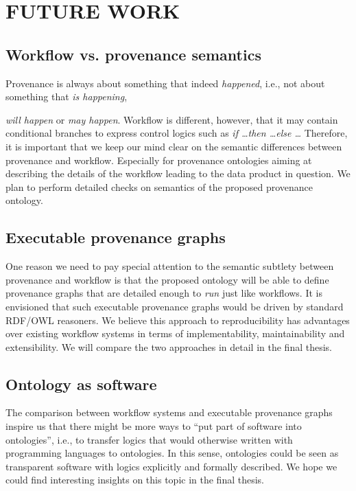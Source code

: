 \chapter{FUTURE WORK}
\label{future-work}
\section{Workflow vs. provenance semantics}
Provenance is always about something that indeed \emph{happened}, i.e., not about something that \emph{is happening}, {\emph{will happen} or \emph{may happen}. Workflow is different, however, that it may contain conditional branches to express control logics such as \emph{if \dots then \dots else \dots} Therefore, it is important that we keep our mind clear on the semantic differences between provenance and workflow. Especially for provenance ontologies aiming at describing the details of the workflow leading to the data product in question. We plan to perform detailed checks on semantics of the proposed provenance ontology.

\section{Executable provenance graphs}
One reason we need to pay special attention to the semantic subtlety between provenance and workflow is that the proposed ontology will be able to define provenance graphs that are detailed enough to \emph{run} just like workflows. It is envisioned that such executable provenance graphs would be driven by standard RDF/OWL reasoners. We believe this approach to reproducibility has advantages over existing workflow systems in terms of implementability, maintainability and extensibility. We will compare the two approaches in detail in the final thesis.

\section{Ontology as software}
The comparison between workflow systems and executable provenance graphs inspire us that there might be more ways to ``put part of software into ontologies'', i.e., to transfer logics that would otherwise written with programming languages to ontologies. In this sense, ontologies could be seen as transparent software with logics explicitly and formally described. We hope we could find interesting insights on this topic in the final thesis.

}
